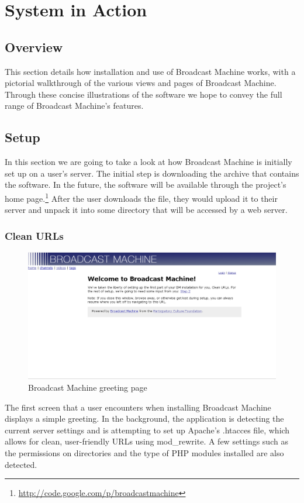 \documentclass[a4paper,12pt]{report}
\begin{document}
\chapter{System in Action}
\section{Overview}
This section details how installation and use of Broadcast Machine works, with a pictorial walkthrough of the various views and pages of Broadcast Machine. 
Through these concise illustrations of the software we hope to convey the full range of Broadcast Machine's features.

\section{Setup}
In this section we are going to take a look at how Broadcast Machine is initially set up on a user's server.
The initial step is downloading the archive that contains the software.
In the future, the software will be available through the project's home page.\footnote{\url{http://code.google.com/p/broadcastmachine}}
After the user downloads the file, they would upload it to their server and unpack it into some directory that will be accessed by a web server.

\subsection{Clean URLs}
  \begin{figure}[h!]
  \begin{center}
  \includegraphics[width=150mm]{./images/setup1.png}
  \caption{Broadcast Machine greeting page}
  \end{center}
  \end{figure}
The first screen that a user encounters when installing Broadcast Machine displays a simple greeting.
In the background, the application is detecting the current server settings and is attempting to set up Apache's .htacces file, which allows for clean, user-friendly URLs using mod\_rewrite.
A few settings such as the permissions on directories and the type of PHP modules installed are also detected.
\end{document}
